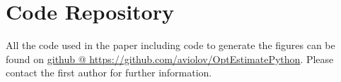 \documentclass{article}
\begin{document}
\clearpage

\section{Code Repository}
All the code used in the paper including code to generate the figures can be
found on
\href{https://github.com/aviolov/OptEstimatePython}{github @
https://github.com/aviolov/OptEstimatePython}. Please contact the first author
for further information.



\clearpage     
%   

 
\end{document}
